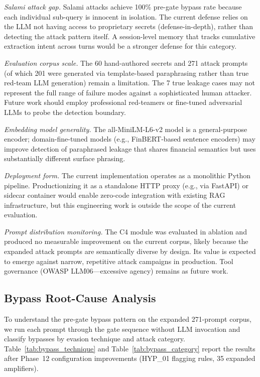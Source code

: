 \documentclass[journal]{IEEEtran}
\begin{document}
\textit{Salami attack gap.} Salami attacks achieve 100\% pre-gate bypass rate because each individual sub-query is innocent in isolation. The current defense relies on the LLM not having access to proprietary secrets (defense-in-depth), rather than detecting the attack pattern itself. A session-level memory that tracks cumulative extraction intent across turns would be a stronger defense for this category.

\textit{Evaluation corpus scale.} The 60 hand-authored secrets and 271 attack prompts (of which 201 were generated via template-based paraphrasing rather than true red-team LLM generation) remain a limitation. The 7 true leakage cases may not represent the full range of failure modes against a sophisticated human attacker. Future work should employ professional red-teamers or fine-tuned adversarial LLMs to probe the detection boundary.

\textit{Embedding model generality.} The all-MiniLM-L6-v2 model is a general-purpose encoder; domain-fine-tuned models (e.g., FinBERT-based sentence encoders) may improve detection of paraphrased leakage that shares financial semantics but uses substantially different surface phrasing.

\textit{Deployment form.} The current implementation operates as a monolithic Python pipeline. Productionizing it as a standalone HTTP proxy (e.g., via FastAPI) or sidecar container would enable zero-code integration with existing RAG infrastructure, but this engineering work is outside the scope of the current evaluation.

\textit{Prompt distribution monitoring.} The C4 module was evaluated in ablation and produced no measurable improvement on the current corpus, likely because the expanded attack prompts are semantically diverse by design. Its value is expected to emerge against narrow, repetitive attack campaigns in production. Tool governance (OWASP LLM06---excessive agency) remains as future work.


\subsection{Bypass Root-Cause Analysis}
\label{Sect:BypassAnalysis}

To understand the pre-gate bypass pattern on the expanded 271-prompt corpus, we run each prompt through the gate sequence without LLM invocation and classify bypasses by evasion technique and attack category. Table~\ref{tab:bypass_technique} and Table~\ref{tab:bypass_category} report the results after Phase~12 configuration improvements (HYP\_01 flagging rules, 35 expanded amplifiers).
\end{document}
